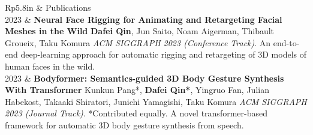 \documentclass[letterpaper, 11pt]{article}
\newcommand{\headingfont}{\Large\color{OliveGreen}\vspace{-.4cm}}
\newenvironment{SectionTable}[1]{
	\renewcommand*{\arraystretch}{1.2}
	\setlength{\tabcolsep}{10pt} %
	\begin{longtable}{Rp{5.8in}} & #1 \\}
{\end{longtable}\vspace{-.4cm}}
\begin{document}
\begin{SectionTable}{\headingfont Publications}
2023 & 
\textbf{Neural Face Rigging for Animating and Retargeting Facial Meshes in the Wild} \newline
\textbf{Dafei Qin}, Jun Saito, Noam Aigerman, Thibault Groueix, Taku Komura \newline
\textit{ACM SIGGRAPH 2023 (Conference Track)}. \newline
An end-to-end deep-learning approach for automatic rigging and retargeting of 3D models of human faces in the wild. 
  \\

2023 & 
\textbf{Bodyformer: Semantics-guided 3D Body Gesture Synthesis With Transformer} \newline
Kunkun Pang*, \textbf{Dafei Qin*}, Yingruo Fan, Julian Habekost, Takaaki Shiratori, Junichi Yamagishi, Taku Komura \newline
\textit{ACM SIGGRAPH 2023 (Journal Track)}. \newline
*Contributed equally. \newline
A novel transformer-based framework for automatic 3D body gesture synthesis from speech. 

 \\


\end{SectionTable}



\end{document}
